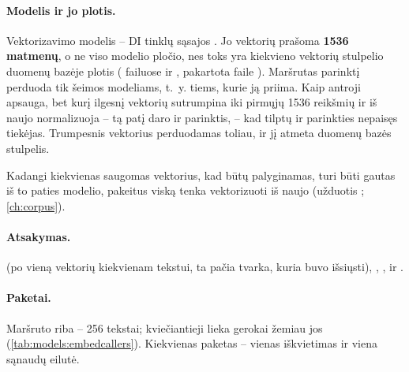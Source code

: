 \paragraph{Modelis ir jo plotis.} Vektorizavimo modelis -- DI tinklų sąsajos
. Jo vektorių prašoma \textbf{1536 matmenų}, o ne viso modelio
pločio, nes toks yra kiekvieno vektorių stulpelio duomenų bazėje plotis
( failuose  ir ,
pakartota faile ). Maršrutas parinktį  perduoda tik
 šeimos modeliams, t.~y. tiems, kurie ją priima. Kaip antroji
apsauga,  bet kurį ilgesnį vektorių sutrumpina iki pirmųjų 1536 reikšmių ir
iš naujo normalizuoja -- tą patį daro ir parinktis, -- kad tilptų ir parinkties nepaisęs
tiekėjas. Trumpesnis vektorius perduodamas toliau, ir jį atmeta duomenų bazės stulpelis.

Kadangi kiekvienas saugomas vektorius, kad būtų palyginamas, turi būti gautas iš to paties
modelio, pakeitus  viską tenka vektorizuoti iš naujo (užduotis
; \cref{ch:corpus}).

\paragraph{Atsakymas.}  (po vieną vektorių kiekvienam tekstui, ta pačia
tvarka, kuria buvo išsiųsti), , ,  ir
.

\paragraph{Paketai.} Maršruto riba -- 256 tekstai; kviečiantieji lieka gerokai žemiau jos
(\cref{tab:models:embedcallers}). Kiekvienas paketas -- vienas iškvietimas ir viena sąnaudų
eilutė.

